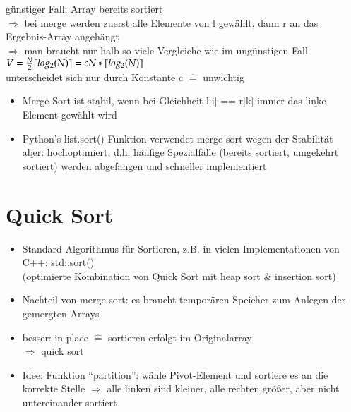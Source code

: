         günstiger Fall: Array bereits sortiert \\

        $\Rightarrow$ bei merge werden zuerst alle Elemente von l gewählt, dann r an das Ergebnis-Array angehängt \\

        $\Rightarrow$ man braucht nur halb so viele Vergleiche wie im ungünstigen Fall \\

        \hspace*{5mm} $V= \frac{N}{2} \lceil log_2(N)\rceil = c N * \lceil log_2(N)\rceil$ \\

        unterscheidet sich nur durch Konstante c $\widehat{=}$ unwichtig \\

        \begin{itemize}
            \item Merge Sort ist $\underline{\text{stabil}}$, wenn bei Gleichheit l[i] == r[k] immer das $\underline{\text{linke}}$ Element gewählt wird
            \item Python's list.sort()-Funktion verwendet merge sort wegen der Stabilität\\
            $\underline{\text{aber}}$: hochoptimiert, d.h. häufige Spezialfälle (bereits sortiert, umgekehrt sortiert) werden abgefangen und schneller implementiert
        \end{itemize}

    \section{Quick Sort}

    \begin{itemize}
        \item Standard-Algorithmus für Sortieren, z.B. in vielen Implementationen von C++:  std::sort() \\
        (optimierte Kombination von Quick Sort mit heap sort \& insertion sort)
        \item Nachteil von merge sort: es braucht temporären Speicher zum Anlegen der gemergten Arrays
        \item besser: in-place $\widehat{=}$ sortieren erfolgt im Originalarray \\
        $\Rightarrow$ quick sort
        \item Idee: Funktion ``partition'': wähle Pivot-Element und sortiere es an die korrekte Stelle $\Rightarrow$ alle linken sind kleiner, alle rechten größer, aber nicht untereinander sortiert
    \end{itemize}

